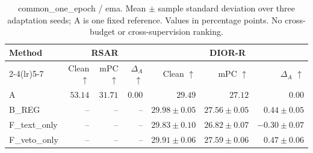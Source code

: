 \begin{table}[t]
\centering
\setlength{\tabcolsep}{4pt}
\renewcommand{\arraystretch}{1.15}
\caption{common\_one\_epoch / ema. Mean $\pm$ sample standard deviation over three adaptation seeds; A is one fixed reference. Values in percentage points. No cross-budget or cross-supervision ranking.}
\begin{tabular}{@{}lrrrrrr@{}}
\toprule
Method & \multicolumn{3}{c}{RSAR} & \multicolumn{3}{c}{DIOR-R} \\
\cmidrule(lr){2-4}\cmidrule(lr){5-7}
 & Clean $\uparrow$ & mPC $\uparrow$ & $\Delta_A$ $\uparrow$ & Clean $\uparrow$ & mPC $\uparrow$ & $\Delta_A$ $\uparrow$ \\
\midrule
A & $53.14$ & $31.71$ & $0.00$ & $29.49$ & $27.12$ & $0.00$ \\
B\_REG & -- & -- & -- & $29.98 \pm 0.05$ & $27.56 \pm 0.05$ & $0.44 \pm 0.05$ \\
F\_text\_only & -- & -- & -- & $29.83 \pm 0.10$ & $26.82 \pm 0.07$ & $-0.30 \pm 0.07$ \\
F\_veto\_only & -- & -- & -- & $29.91 \pm 0.06$ & $27.59 \pm 0.06$ & $0.47 \pm 0.06$ \\
\bottomrule
\end{tabular}
\end{table}
